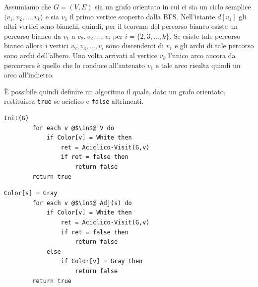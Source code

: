 Assumiamo che $G=(V,E)$ sia un grafo orientato in cui ci sia un ciclo semplice $\langle v_{1},v_{2},\ldots,v_{k} \rangle$ e sia $v_{1}$ il primo vertice scoperto dalla \textsc{BFS}. Nell'istante $d[v_{1}]$ gli altri vertici sono bianchi, quindi, per il teorema del percorso bianco esiste un percorso bianco da $v_{1}$ a $v_{2},v_{2}, \ldots, v_{i}$ per $i=\{2,3,\ldots,k\}$. Se esiste tale percorso bianco allora i vertici $v_{2},v_{3}, \ldots, v_{i}$ sono discendenti di $v_{1}$ e gli archi di tale percorso sono archi dell'albero. Una volta arrivati al vertice $v_{k}$ l'unico arco ancora da percorrere è quello che lo conduce all'antenato $v_{1}$ e tale arco risulta quindi un arco all'indietro.
\begin{center}
\end{center}

È possibile quindi definire un algoritmo il quale, dato un grafo orientato, restituisca \texttt{true} se aciclico e \texttt{false} altrimenti.
\begin{minipage}{.4\textwidth}
	\begin{lstlisting}[language=asd,caption={\textsc{Aciclico}(G)}]
		Init(G)
		for each v @$\in$@ V do
			if Color[v] = White then
				ret = Aciclico-Visit(G,v)
				if ret = false then
					return false
		return true
	\end{lstlisting}
\end{minipage}
\begin{minipage}{.4\textwidth}
	\begin{lstlisting}[caption={\textsc{Aciclico-Visit}(G,s)},language=asd]
		Color[s] = Gray
		for each v @$\in$@ Adj(s) do
			if Color[v] = White then
				ret = Aciclico-Visit(G,v)
				if ret = false then
					return false
			else
				if Color[v] = Gray then
					return false
		return true
	\end{lstlisting}
\end{minipage}
\newpage

